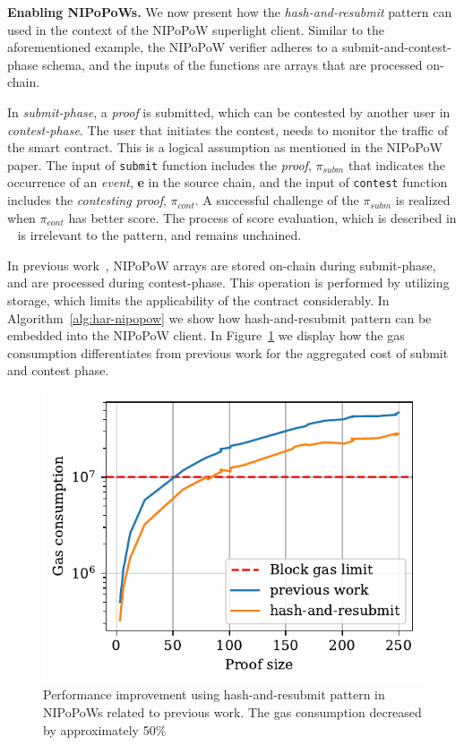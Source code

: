 \noindent \textbf{Enabling NIPoPoWs.} We now present how the
\emph{hash-and-resubmit} pattern can used in the context of the NIPoPoW
superlight client. Similar to the aforementioned example, the NIPoPoW verifier
adheres to a submit-and-contest-phase schema, and the inputs of the functions
are arrays that are processed on-chain.

In \emph{submit-phase}, a \emph{proof} is submitted, which can be contested by
another user in \emph{contest-phase}.  The user that initiates the contest,
needs to monitor the traffic of the smart contract. This is a logical
assumption as mentioned in the NIPoPoW paper. The input of \texttt{submit}
function includes the \emph{proof}, $\pi_{subm}$ that indicates the occurrence
of an \emph{event}, \textbf{e} in the source chain, and the input of
\texttt{contest} function includes the \emph{contesting proof}, $\pi_{cont}$. A
successful challenge of the $\pi_{subm}$ is realized when $\pi_{cont}$ has
better score. The process of score evaluation, which is described in
~\cite{nipopows} is irrelevant to the pattern, and remains unchained.

In previous work~\cite{gglou}, NIPoPoW arrays are stored on-chain during
submit-phase, and are processed during contest-phase. This operation is
performed by utilizing storage, which limits the applicability of the contract
considerably. In Algorithm~\ref{alg:har-nipopow} we show how hash-and-resubmit
pattern can be embedded into the NIPoPoW client. In
Figure~\ref{fig:har-nipopow} we display how the gas consumption differentiates
from previous work for the aggregated cost of submit and contest phase.




\begin{figure}[h]
    \begin{center}
        \includegraphics[width=1\columnwidth]{figures/har-nipopows.pdf}
    \end{center}
    \caption{Performance improvement using hash-and-resubmit pattern in
    NIPoPoWs related to previous work. The gas consumption decreased by
    approximately 50\%}
    \label{fig:har-nipopow}
\end{figure}

